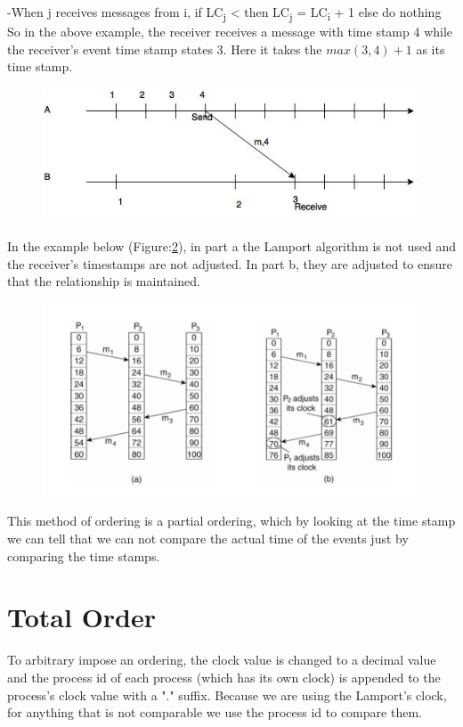 \documentclass[twoside]{article}
\begin{document}
-When j receives messages from i, if LC\textsubscript{j} \textless {} then LC\textsubscript{j} = LC\textsubscript{i} + 1 else do nothing
So in the above example, the receiver receives a message with time stamp 4 while the receiver's event time stamp states 3. Here it takes the $max(3,4)+1$ as its time stamp.
\begin{figure}[h]
\centering
\includegraphics[width=\textwidth]{diagram_2.jpg}
\label{fig:piggy back clock}
\caption{}
\end{figure}
In the example below (Figure:\ref{fig:book_slide_example}), in part a the Lamport algorithm is not used and the receiver's timestamps are not adjusted. In part b, they are adjusted to ensure that the relationship is maintained.
\begin{figure}[h]
\centering
\includegraphics[width=\textwidth]{diagram3.jpg}
\label{fig:book_slide_example}
\caption{}
\end{figure}
This method of ordering is a partial ordering, which by looking at the time stamp we can tell that we can not compare the actual time of the events just by comparing the time stamps.
\section{Total Order}
To arbitrary impose an ordering, the clock value is changed to a decimal value and  the process id of each process (which has its own clock) is appended to the process's clock value with a "." suffix. Because we are using the Lamport's clock, for anything that is not comparable we use the process id to compare them. 
\end{document}
